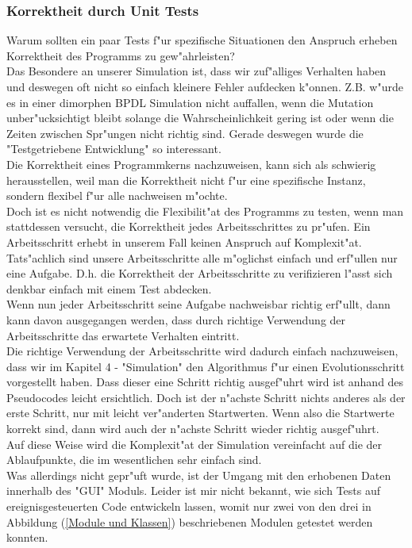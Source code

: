 \documentclass[11pt, a4paper, german]{article}
\theoremstyle{plain}
\begin{document}
	\subsubsection{Korrektheit durch Unit Tests}
	Warum sollten ein paar Tests f"ur spezifische Situationen den Anspruch erheben Korrektheit des Programms zu gew"ahrleisten?\\
	Das Besondere an unserer Simulation ist, dass wir zuf"alliges Verhalten haben und deswegen oft nicht so einfach kleinere Fehler aufdecken k"onnen. Z.B. w"urde es in einer dimorphen BPDL Simulation nicht auffallen, wenn die Mutation unber"ucksichtigt bleibt solange die Wahrscheinlichkeit gering ist oder wenn die Zeiten zwischen Spr"ungen nicht richtig sind. Gerade deswegen wurde die "{}Testgetriebene Entwicklung"{} so interessant.\\
	Die Korrektheit eines Programmkerns nachzuweisen, kann sich als schwierig herausstellen, weil man die Korrektheit nicht f"ur eine spezifische Instanz, sondern flexibel f"ur alle nachweisen m"ochte.\\
	Doch ist es nicht notwendig die Flexibilit"at des Programms zu testen, wenn man stattdessen versucht, die Korrektheit jedes Arbeitsschrittes zu pr"ufen. Ein Arbeitsschritt erhebt in unserem Fall keinen Anspruch auf Komplexit"at. Tats"achlich sind unsere Arbeitsschritte alle m"oglichst einfach und erf"ullen nur eine Aufgabe. D.h. die Korrektheit der Arbeitsschritte zu verifizieren l"asst sich denkbar einfach mit einem Test abdecken.\\
	Wenn nun jeder Arbeitsschritt seine Aufgabe nachweisbar richtig erf"ullt, dann kann davon ausgegangen werden, dass durch richtige Verwendung der Arbeitsschritte das erwartete Verhalten eintritt.\\
	Die richtige Verwendung der Arbeitsschritte wird dadurch einfach nachzuweisen, dass wir im Kapitel 4 - "{}Simulation"{} den Algorithmus f"ur einen Evolutionsschritt vorgestellt haben. Dass dieser eine Schritt richtig ausgef"uhrt wird ist anhand des Pseudocodes leicht ersichtlich. Doch ist der n"achste Schritt nichts anderes als der erste Schritt, nur mit leicht ver"anderten Startwerten. Wenn also die Startwerte korrekt sind, dann wird auch der n"achste Schritt wieder richtig ausgef"uhrt.\\
	Auf diese Weise wird die Komplexit"at der Simulation vereinfacht auf die der Ablaufpunkte, die im wesentlichen sehr einfach sind.\\
	Was allerdings nicht gepr"uft wurde, ist der Umgang mit den erhobenen Daten innerhalb des "{}GUI"{} Moduls. Leider ist mir nicht bekannt, wie sich Tests auf ereignisgesteuerten Code entwickeln lassen, womit nur zwei von den drei in Abbildung (\ref{Module und Klassen}) beschriebenen Modulen getestet werden konnten.
\end{document}
